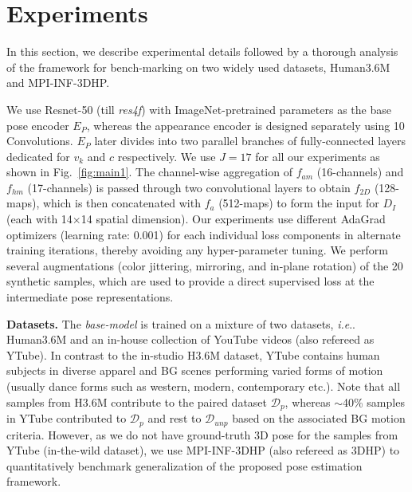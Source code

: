 \documentclass[letterpaper]{article} \usepackage{aaai20}  \usepackage{times}  \usepackage{helvet}  \usepackage{courier}  \usepackage{url}  \usepackage{graphicx}  \usepackage{amsmath}
\makeatletter
\DeclareRobustCommand\onedot{\futurelet\@let@token\@onedot}
\def\@onedot{\ifx\@let@token.\else.\null\fi\xspace}
\def\ie{\emph{i.e}\onedot} \def\Ie{\emph{I.e}\onedot}
\makeatother
\begin{document}
\section{Experiments}
In this section, we describe experimental details followed by a thorough analysis of the framework for bench-marking on two widely used datasets, Human3.6M and MPI-INF-3DHP.  




We use Resnet-50 (till \textit{res4f}) with ImageNet-pretrained parameters as the base pose encoder $E_P$, whereas the appearance encoder is designed separately using 10 Convolutions. $E_P$ later divides into two parallel branches of fully-connected layers dedicated for $v_k$ and $c$ respectively. We use $J=17$ for all our experiments as shown in Fig.~\ref{fig:main1}. The channel-wise aggregation of $f_{am}$ (16-channels) and $f_{hm}$ (17-channels) is passed through two convolutional layers to obtain $f_{2D}$ (128-maps), which is then concatenated with $f_a$ (512-maps) to form the input for $D_I$ (each with 14$\times$14 spatial dimension). Our experiments use different AdaGrad optimizers (learning rate: 0.001) for each individual loss components in alternate training iterations, thereby avoiding any hyper-parameter tuning. We perform several augmentations (color jittering, mirroring, and in-plane rotation) of the 20 synthetic samples, which are used to provide a direct supervised loss at the intermediate pose representations.

\textbf{Datasets.} The \textit{base-model} is trained on a mixture of two datasets, \ie Human3.6M and an in-house collection of YouTube videos (also refereed as YTube). In contrast to the in-studio H3.6M dataset, YTube contains human subjects in diverse apparel and BG scenes performing varied forms of motion (usually dance forms such as western, modern, contemporary etc.). Note that all samples from H3.6M contribute to the paired dataset $\mathcal{D}_p$, whereas $\sim$40\% samples in YTube contributed to $\mathcal{D}_p$ and rest to $\mathcal{D}_{unp}$ based on the associated BG motion criteria. However, as we do not have ground-truth 3D pose for the samples from YTube (in-the-wild dataset), we use MPI-INF-3DHP (also refereed as 3DHP) to quantitatively benchmark generalization of the proposed pose estimation framework.
\end{document}
